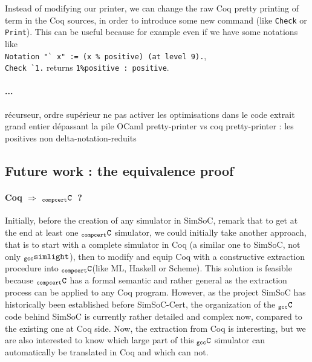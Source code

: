 \documentclass[a4paper, 11pt]{article}
\newcommand{\gccSL}{$_{\tt gcc}{\tt simlight}$\xspace}
\newcommand{\CCasm}{$_{\tt compcert}{\tt ASM}$\xspace}
\newcommand{\C}{$_{\tt compcert}{\tt C}$\xspace}
\newcommand{\gccC}{$_{\tt gcc}{\tt C}$\xspace}
\newcommand{\simsoc}{SimSoC\xspace}
\newcommand{\SScert}{SimSoC-Cert\xspace}
\begin{document}
Instead of modifying our printer, we can change the raw Coq pretty printing of term in the Coq sources, in order to introduce some new command (like \verb|Check| or \verb|Print|). This can be useful because for example even if we have some notations like \\
\verb|Notation "` x" := (x % positive) (at level 9).|, \\
\verb|Check `1.| returns \verb|1%positive : positive|.



\paragraph{...}
récurseur, ordre supérieur
ne pas activer les optimisations dans le code extrait
grand entier dépassant la pile OCaml
pretty-printer vs coq pretty-printer : les positives non delta-notation-reduits

\subsection{Future work : the equivalence proof}
\paragraph{Coq $\Longrightarrow$ \C~?}
Initially, before the creation of any simulator in \simsoc, remark that to get at the end at least one \C simulator, we could initially take another approach, that is to start with a complete simulator in Coq (a similar one to \simsoc, not only \gccSL), then to modify and equip Coq with a constructive extraction procedure into \C (like ML, Haskell or Scheme). This solution is feasible because \C has a formal semantic and rather general as the extraction process can be applied to any Coq program. However, as the project \simsoc has historically been established before \SScert, the organization of the \gccC code behind \simsoc is currently rather detailed and complex now, compared to the existing one at Coq side. Now, the extraction from Coq is interesting, but we are also interested to know which large part of this \gccC simulator can automatically be translated in Coq and which can not.
\end{document}
